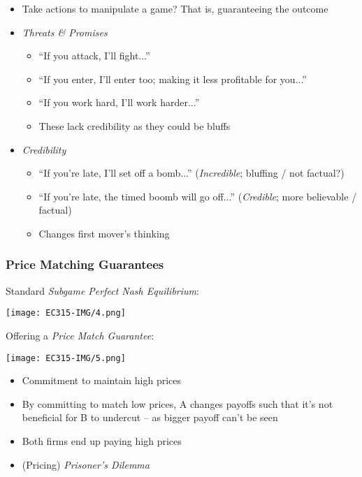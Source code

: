 \documentclass[11pt, english]{article}
\begin{document}
	\begin{itemize}
	\setlength\itemsep{0cm}
		\item Take actions to manipulate a game? That is, guaranteeing the outcome
		\item \textit{Threats \& Promises}
		\begin{itemize}
			\item ``If you attack, I'll fight...''
			\item ``If you enter, I'll enter too; making it less profitable for you...''
			\item ``If you work hard, I'll work harder...''
			\item These lack credibility as they could be bluffs
		\end{itemize}
		\item \textit{Credibility}
		\begin{itemize}
			\item ``If you're late, I'll set off a bomb...'' (\textit{Incredible}; bluffing / not factual?)
			\item ``If you're late, the timed boomb will go off...'' (\textit{Credible}; more believable / factual)
			\item Changes first mover's thinking
		\end{itemize}
	\end{itemize}

		\subsubsection{Price Matching Guarantees}
	
	Standard \textit{Subgame Perfect Nash Equilibrium}:

	\begin{center}
		\texttt{[image: EC315-IMG/4.png]}
	\end{center}

	Offering a \textit{Price Match Guarantee}:

	\begin{center}
		\texttt{[image: EC315-IMG/5.png]}
	\end{center}

	\begin{itemize}
	\setlength\itemsep{0cm}
		\item Commitment to maintain high prices
		\item By committing to match low prices, A changes payoffs such that it's not beneficial for B to undercut – as bigger payoff can't be seen 
		\item Both firms end up paying high prices
		\item (Pricing) \textit{Prisoner's Dilemma}
	\end{itemize}
\end{document}
